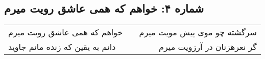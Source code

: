 \begin{center}
\section*{شماره ۴: خواهم که همی عاشق رویت میرم}
\label{sec:004}
\begin{longtable}{l p{0.5cm} r}
خواهم که همی عاشق رویت میرم
&&
سرگشته چو موی پیش مویت میرم
\\
دانم به یقین که زنده مانم جاوید
&&
گر نعرهزنان در آرزویت میرم
\\
\end{longtable}
\end{center}
